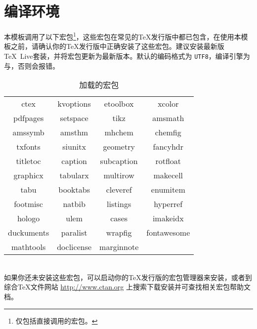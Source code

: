 
\chapter{编译环境}
本模板调用了以下宏包\footnote{仅包括直接调用的宏包。}，这些宏包在常见的\TeX 发行版中都已包含，在使用本模板之前，请确认你的\TeX 发行版中正确安装了这些宏包。建议安装最新版\TeX~Live套装，并将宏包更新为最新版本。默认的编码格式为 \lstinline{UTF8}，编译引擎为与，\textsf{否则会报错}。
\begin{table}[htbp]
	\centering
	\caption{加载的宏包}\sffamily
	\renewcommand\tabcolsep{1em}    
	\setcellgapes{.8ex}\makegapedcells
	\begin{tabular}{cccc}
	\toprule
		ctex        & kvoptions     & etoolbox      & xcolor \\
		pdfpages    & setspace      & tikz          & amsmath \\
		amssymb     & amsthm        & mhchem        & chemfig \\
		txfonts     & siunitx       & geometry      & fancyhdr \\
		titletoc    & caption       & subcaption    & rotfloat \\
		graphicx    & tabularx      & multirow      & makecell \\
		tabu        & booktabs      & cleveref      & enumitem \\
		footmisc    & natbib        & listings      & hyperref \\
		hologo		& ulem			& cases			& imakeidx \\
		duckuments 	& paralist 		& wrapfig 		& fontawesome \\
		mathtools   & doclicense 	& marginnote \\
	\bottomrule
	\end{tabular}
\end{table}\\
如果你还未安装这些宏包，可以启动你的\TeX 发行版的宏包管理器来安装，或者到综合\TeX 文件网站 \url{http://www.ctan.org} 上搜索下载安装并可查找相关宏包帮助文档。